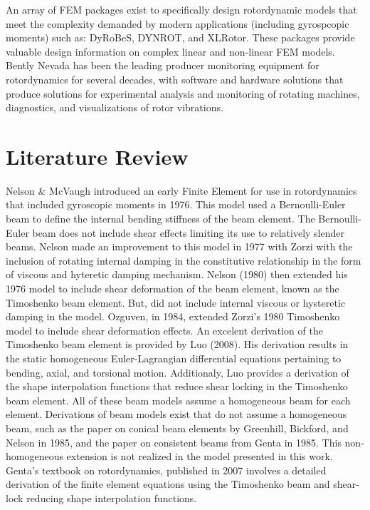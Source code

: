 An array of FEM packages exist to specifically design rotordynamic models that meet the complexity demanded by modern applications (including gyrospcopic moments) such as: DyRoBeS, DYNROT, and XLRotor. These packages provide valuable design information on complex linear and non-linear FEM models. Bently Nevada has been the leading producer monitoring equipment for rotordynamics for several decades, with software and hardware solutions that produce solutions for experimental analysis and monitoring of rotating machines, diagnostics, and visualizations of rotor vibrations.\par
\section{Literature Review}\label{LiteratureReview}
Nelson \& McVaugh \cite{nelson1976dynamics} introduced an early Finite Element for use in rotordynamics that included gyroscopic moments in 1976. This model used a Bernoulli-Euler beam to define the internal bending stiffness of the beam element. The Bernoulli-Euler beam does not include shear effects limiting its use to relatively slender beams. Nelson made an improvement to this model in 1977 with Zorzi \cite{zorzi1977finite} with the inclusion of rotating internal damping in the constitutive relationship in the form of viscous and hyteretic damping mechanism. Nelson (1980)\cite{nelson1980finite} then extended his 1976 model to include shear deformation of the beam element, known as the Timoshenko beam element. But, did not include internal viscous or hysteretic damping in the model. Ozguven, in 1984\cite{ozguven1984whirl}, extended Zorzi's 1980 Timoshenko model to include shear deformation effects.  An excelent derivation of the Timoshenko beam element is provided by Luo (2008)\cite{luo2008efficient}. His derivation results in the static homogeneous Euler-Lagrangian differential equations pertaining to bending, axial, and torsional motion. Additionaly, Luo provides a derivation of the shape interpolation functions that reduce shear locking in the Timoshenko beam element. All of these beam models assume a homogeneous beam for each element. Derivations of beam models exist that do not assume a homogeneous beam, such as the paper on conical beam elements by Greenhill, Bickford, and Nelson in 1985\cite{greenhill1985conical}, and the paper on consistent beams from Genta in 1985\cite{genta1985consistent}. This non-homogeneous extension is not realized in the model presented in this work. Genta's textbook on rotordynamics, published in 2007\cite{genta2007dynamics} involves a detailed derivation of the finite element equations using the Timoshenko beam and shear-lock reducing shape interpolation functions.\par 
